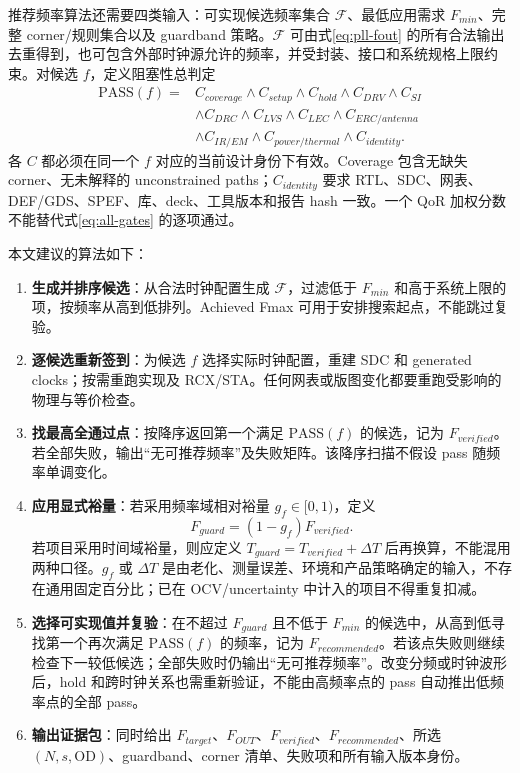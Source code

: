 \documentclass[UTF8,a4paper,11pt,fontset=fandol]{ctexart}
\numberwithin{equation}{section}
\begin{document}
推荐频率算法还需要四类输入：可实现候选频率集合 $\mathcal{F}$、最低应用需求 $F_{min}$、完整 corner/规则集合以及 guardband 策略。$\mathcal{F}$ 可由式\eqref{eq:pll-fout} 的所有合法输出去重得到，也可包含外部时钟源允许的频率，并受封装、接口和系统规格上限约束。对候选 $f$，定义阻塞性总判定
\begin{equation}
\begin{aligned}
\mathrm{PASS}(f)={}&C_{coverage}\land C_{setup}\land C_{hold}\land C_{DRV}\land C_{SI}\\
&\land C_{DRC}\land C_{LVS}\land C_{LEC}\land C_{ERC/antenna}\\
&\land C_{IR/EM}\land C_{power/thermal}\land C_{identity}.
\end{aligned}
\label{eq:all-gates}
\end{equation}
各 $C$ 都必须在同一个 $f$ 对应的当前设计身份下有效。Coverage 包含无缺失 corner、无未解释的 unconstrained paths；$C_{identity}$ 要求 RTL、SDC、网表、DEF/GDS、SPEF、库、deck、工具版本和报告 hash 一致。一个 QoR 加权分数不能替代式\eqref{eq:all-gates} 的逐项通过。

本文建议的算法如下：
\begin{enumerate}
  \item \textbf{生成并排序候选}：从合法时钟配置生成 $\mathcal{F}$，过滤低于 $F_{min}$ 和高于系统上限的项，按频率从高到低排列。Achieved Fmax 可用于安排搜索起点，不能跳过复验。
  \item \textbf{逐候选重新签到}：为候选 $f$ 选择实际时钟配置，重建 SDC 和 generated clocks；按需重跑实现及 RCX/STA。任何网表或版图变化都要重跑受影响的物理与等价检查。
  \item \textbf{找最高全通过点}：按降序返回第一个满足 $\mathrm{PASS}(f)$ 的候选，记为 $F_{verified}$。若全部失败，输出“无可推荐频率”及失败矩阵。该降序扫描不假设 pass 随频率单调变化。
  \item \textbf{应用显式裕量}：若采用频率域相对裕量 $g_f\in[0,1)$，定义
  \begin{equation}
  F_{guard}=(1-g_f)F_{verified}.
  \end{equation}
  若项目采用时间域裕量，则应定义 $T_{guard}=T_{verified}+\Delta T$ 后再换算，不能混用两种口径。$g_f$ 或 $\Delta T$ 是由老化、测量误差、环境和产品策略确定的输入，不存在通用固定百分比；已在 OCV/uncertainty 中计入的项目不得重复扣减。
  \item \textbf{选择可实现值并复验}：在不超过 $F_{guard}$ 且不低于 $F_{min}$ 的候选中，从高到低寻找第一个再次满足 $\mathrm{PASS}(f)$ 的频率，记为 $F_{recommended}$。若该点失败则继续检查下一较低候选；全部失败时仍输出“无可推荐频率”。改变分频或时钟波形后，hold 和跨时钟关系也需重新验证，不能由高频率点的 pass 自动推出低频率点的全部 pass。
  \item \textbf{输出证据包}：同时给出 $F_{target}$、$F_{OUT}$、$F_{verified}$、$F_{recommended}$、所选 $(N,s,\mathrm{OD})$、guardband、corner 清单、失败项和所有输入版本身份。
\end{enumerate}
\end{document}
